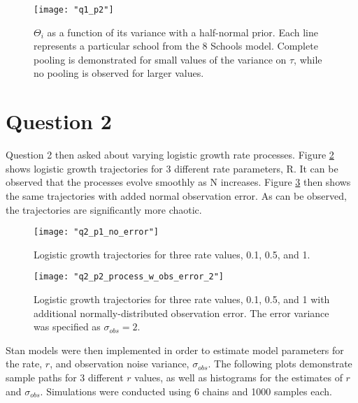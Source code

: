 \documentclass{article}[12 pt]
\begin{document}
\begin{center}
	\begin{figure}[H]
		\centering
		\texttt{[image: "q1\_p2"]}
		\caption{$\Theta_i$ as a function of its variance with a half-normal prior.  Each line represents a particular school from the 8 Schools model.  Complete pooling is demonstrated for small values of the variance on $\tau$, while no pooling is observed for larger values.}
		\label{fig:q1_p2}
	\end{figure}
\end{center}

\section*{Question 2}
Question 2 then asked about varying logistic growth rate processes.  Figure \ref{fig:q2_p1_no_error} shows logistic growth trajectories for 3 different rate parameters, R.  It can be observed that the processes evolve smoothly as N increases.  Figure \ref{fig:q2_p2_process_w_obs_error_2} then shows the same trajectories with added normal observation error.  As can be observed, the trajectories are significantly more chaotic.


\begin{center}
	\begin{figure}[H]
		\centering
		\texttt{[image: "q2\_p1\_no\_error"]}
		\caption{Logistic growth trajectories for three rate values, 0.1, 0.5, and 1.}
		\label{fig:q2_p1_no_error}
	\end{figure}
\end{center}

\begin{center}
	\begin{figure}[H]
		\centering
		\texttt{[image: "q2\_p2\_process\_w\_obs\_error\_2"]}
		\caption{Logistic growth trajectories for three rate values, 0.1, 0.5, and 1 with additional normally-distributed observation error.  The error variance was specified as $\sigma_{obs}=2$.}
		\label{fig:q2_p2_process_w_obs_error_2}
	\end{figure}
\end{center}

\noindent
Stan models were then implemented in order to estimate model parameters for the rate, $r$, and observation noise variance, $\sigma_{obs}$.   The following plots demonstrate sample paths for 3 different $r$ values, as well as histograms for the estimates of $r$ and $\sigma_{obs}$.  Simulations were conducted using 6 chains and 1000 samples each.
\end{document}
